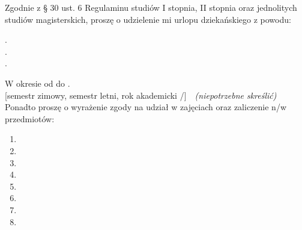 \documentclass{wmiisubmission}
\begin{document}
\cracowdate
{}
\studentaddress
\addressee[-2cm]{\piotrniemiec}

\vskip 0.5cm


\vskip 0.5cm

Zgodnie z § 30 ust. 6 Regulaminu studiów I stopnia, II stopnia oraz jednolitych
studiów magisterskich, proszę o udzielenie mi urlopu dziekańskiego z powodu:\\

\vskip 0.3cm
\begin{minipage}{\textwidth}
.\dotfill\\

.\dotfill\\

.\dotfill\\
\end{minipage}
\vskip 0.3cm

W okresie od \fillField{3cm} do \fillField{3cm}.\\
{[semestr zimowy, semestr letni, rok akademicki \fillField{1cm}/\fillField{1cm}]}~~\textit{(niepotrzebne skreślić)}\\

Ponadto proszę o wyrażenie zgody na udział w zajęciach oraz zaliczenie n/w przedmiotów:

    \begin{multicols}{2}
    \begin{enumerate}
        \item \dotfill
        \item \dotfill
        \item \dotfill
        \item \dotfill
        \item \dotfill
        \item \dotfill
        \item \dotfill
        \item \dotfill
    \end{enumerate}
    \end{multicols}

\vskip 0.3cm

\studentsignature

\vfill


\end{document}
